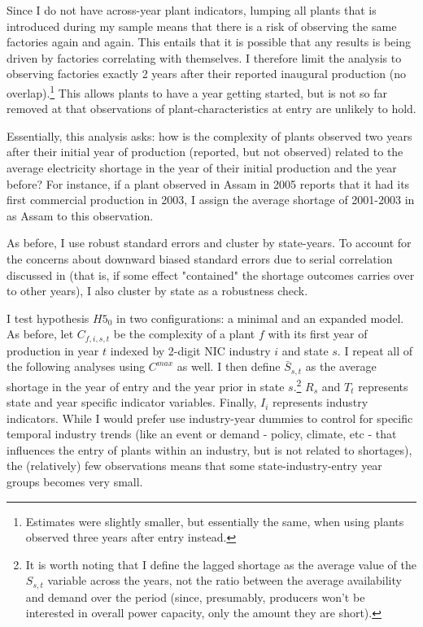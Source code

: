 \documentclass[11pt]{article}
\begin{document}
Since I do not have across-year plant indicators, lumping all plants that is introduced during my sample means that there is a risk of observing the same factories again and again. This entails that it is possible that any results is being driven by factories correlating with themselves. I therefore limit the analysis to observing factories exactly 2 years after their reported inaugural production (no overlap).\footnote{Estimates were slightly smaller, but essentially the same, when using plants observed three years after entry instead.} This allows plants to have a year getting started, but is not so far removed at that observations of plant-characteristics at entry are unlikely to hold.

Essentially, this analysis asks: how is the complexity of plants observed two years after their initial year of production (reported, but not observed) related to the average electricity shortage in the year of their initial production and the year before? For instance, if a plant observed in Assam in 2005 reports that it had its first commercial production in 2003, I assign the average shortage of 2001-2003 in as Assam to this observation. 

As before, I use robust standard errors and cluster by state-years. To account for the concerns about downward biased standard errors due to serial correlation discussed in \cite{bertrand_how_2004} (that is, if some effect "contained" the shortage outcomes carries over to other years), I also cluster by state as a robustness check.

I test hypothesis $H5_0$ in two configurations: a minimal and an expanded model. As before, let $C_{f,i,s,t}$ be the complexity of a plant $f$ with its first year of production in year $t$ indexed by 2-digit NIC industry $i$ and state $s$. I repeat all of the following analyses using $C^{max}$ as well. I then define $\bar{S}_{s,t}$ as the average shortage in the year of entry and the year prior in state $s$.\footnote{It is worth noting that I define the lagged shortage as the average value of the $S_{s,t}$ variable across the years, not the ratio between the average availability and demand over the period (since, presumably, producers won't be interested in overall power capacity, only the amount they are short).} $R_{s}$ and $T_{t}$ represents state and year specific indicator variables. Finally, $I_{i}$ represents industry indicators. While I would prefer use industry-year dummies to control for specific temporal industry trends (like an event or demand - policy, climate, etc - that influences the entry of plants within an industry, but is not related to shortages), the (relatively) few observations means that some state-industry-entry year groups becomes very small. 
\end{document}
